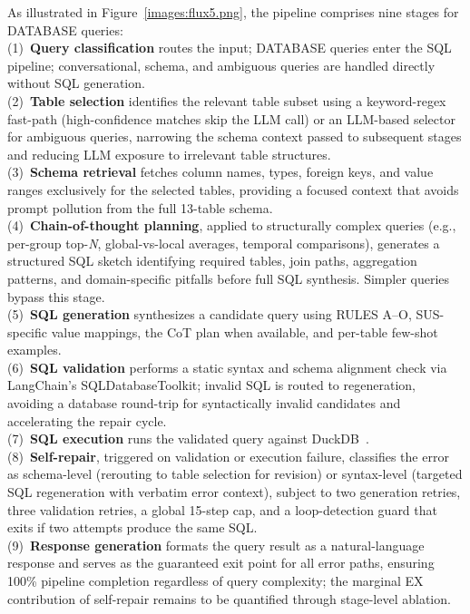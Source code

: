 \documentclass[conference]{IEEEtran}
\begin{document}
As illustrated in Figure~\ref{images:flux5.png}, the pipeline comprises nine stages for DATABASE queries:
\\(1)~\textbf{Query classification} routes the input; DATABASE queries enter the SQL pipeline; conversational, schema, and ambiguous queries are handled directly without SQL generation.
\\(2)~\textbf{Table selection} identifies the relevant table subset using a keyword-regex fast-path (high-confidence matches skip the LLM call) or an LLM-based selector for ambiguous queries, narrowing the schema context passed to subsequent stages and reducing LLM exposure to irrelevant table structures.
\\(3)~\textbf{Schema retrieval} fetches column names, types, foreign keys, and value ranges exclusively for the selected tables, providing a focused context that avoids prompt pollution from the full 13-table schema.
\\(4)~\textbf{Chain-of-thought planning}, applied to structurally complex queries (e.g., per-group top-\textit{N}, global-vs-local averages, temporal comparisons), generates a structured SQL sketch identifying required tables, join paths, aggregation patterns, and domain-specific pitfalls before full SQL synthesis. Simpler queries bypass this stage.
\\(5)~\textbf{SQL generation} synthesizes a candidate query using RULES A--O, SUS-specific value mappings, the CoT plan when available, and per-table few-shot examples.
\\(6)~\textbf{SQL validation} performs a static syntax and schema alignment check via LangChain's SQLDatabaseToolkit; invalid SQL is routed to regeneration, avoiding a database round-trip for syntactically invalid candidates and accelerating the repair cycle.
\\(7)~\textbf{SQL execution} runs the validated query against DuckDB~\cite{raasveldt2019duckdb}.
\\(8)~\textbf{Self-repair}, triggered on validation or execution failure, classifies the error as schema-level (rerouting to table selection for revision) or syntax-level (targeted SQL regeneration with verbatim error context), subject to two generation retries, three validation retries, a global 15-step cap, and a loop-detection guard that exits if two attempts produce the same SQL. %
\\(9)~\textbf{Response generation} formats the query result as a natural-language response and serves as the guaranteed exit point for all error paths, ensuring 100\% pipeline completion regardless of query complexity; the marginal EX contribution of self-repair remains to be quantified through stage-level ablation.
\end{document}
